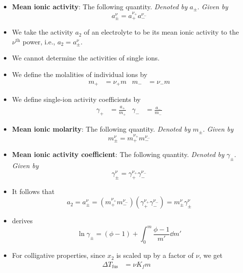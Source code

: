 \documentclass[../notes.tex]{subfiles}
\begin{document}
\begin{itemize}
    \item \textbf{Mean ionic activity}: The following quantity. \emph{Denoted by} $a_\pm$. \emph{Given by}
    \begin{equation*}
        a_\pm^\nu = a_+^{\nu_+}a_-^{\nu_-}
    \end{equation*}
    \item We take the activity $a_2$ of an electrolyte to be its mean ionic activity to the $\nu^\text{th}$ power, i.e., $a_2=a_\pm^\nu$.
    \item We cannot determine the activities of single ions.
    \item We define the molalities of individual ions by
    \begin{align*}
        m_+ &= \nu_+m&
        m_- &= \nu_-m
    \end{align*}
    \item We define single-ion activity coefficients by
    \begin{align*}
        \gamma_+ &= \frac{a_+}{m_+}&
        \gamma_- &= \frac{a_-}{m_-}
    \end{align*}
    \item \textbf{Mean ionic molarity}: The following quantity. \emph{Denoted by} $m_\pm$. \emph{Given by}
    \begin{equation*}
        m_\pm^\nu = m_+^{\nu_+}m_-^{\nu_-}
    \end{equation*}
    \item \textbf{Mean ionic activity coefficient}: The following quantity. \emph{Denoted by} $\gamma_\pm$. \emph{Given by}
    \begin{equation*}
        \gamma_\pm^\nu = \gamma_+^{\nu_+}\gamma_-^{\nu_-}
    \end{equation*}
    \item It follows that
    \begin{equation*}
        a_2 = a_\pm^\nu
        = (m_+^{\nu_+}m_-^{\nu_-})(\gamma_+^{\nu_+}\gamma_-^{\nu_-})
        = m_\pm^\nu\gamma_\pm^\nu
    \end{equation*}
    \item \textcite{bib:McQuarrieSimon} derives
    \begin{equation*}
        \ln\gamma_\pm = (\phi-1)+\int_0^m\frac{\phi-1}{m'}\dd{m'}
    \end{equation*}
    \item For colligative properties, since $x_2$ is scaled up by a factor of $\nu$, we get
    \begin{align*}
        \Delta T_\text{fus} &= \nu K_fm&

\end{align*}
\end{itemize}
\end{document}
